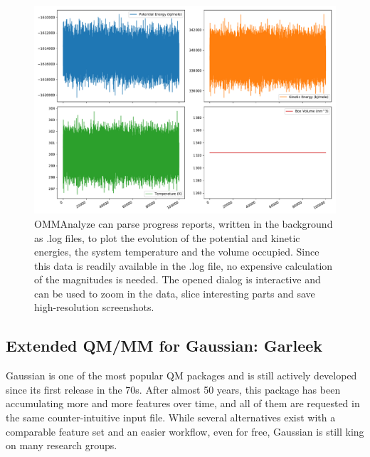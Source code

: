 \begin{figure}[H] %
	\begin{Center}
		\includegraphics[width=\textwidth]{./figures/05/ommanalyze.pdf}
	\end{Center}
	\caption[Example results with OMMAnalyze]{OMMAnalyze can parse progress reports, written in the background as .log files, to plot the evolution of the potential and kinetic energies, the system temperature and the volume occupied. Since this data is readily available in the .log file, no expensive calculation of the magnitudes is needed. The opened dialog is interactive and can be used to zoom in the data, slice interesting parts and save high-resolution screenshots.}
	\label{fig:ommanalyze}
\end{figure}


\subsection{Extended QM/MM for Gaussian: Garleek}


Gaussian\cite{gaussian} is one of the most popular QM packages and is still actively developed since its first release in the 70s. After almost 50 years, this package has been accumulating more and more features over time, and all of them are requested in the same counter-intuitive input file. While several alternatives exist with a comparable feature set and an easier workflow, even for free,\cite{nwchem} Gaussian is still king on many research groups.

